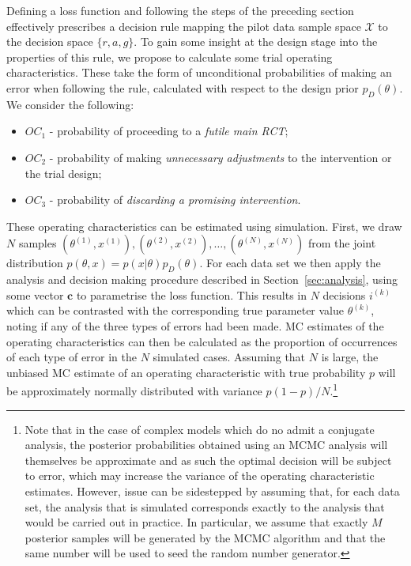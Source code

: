 \documentclass{article} %
\begin{document}
Defining a loss function and following the steps of the preceding section effectively prescribes a decision rule mapping the pilot data sample space $\mathcal{X}$ to the decision space $\{r, a, g\}$. To gain some insight at the design stage into the properties of this rule, we propose to calculate some trial operating characteristics. These take the form of unconditional probabilities of making an error when following the rule, calculated with respect to the design prior $p_D(\theta)$. We consider the following:
\begin{itemize}
\item $OC_1$ - probability of proceeding to a \emph{futile main RCT};
\item $OC_2$ - probability of making \emph{unnecessary adjustments} to the intervention or the trial design;
\item $OC_3$ - probability of \emph{discarding a promising intervention}.
\end{itemize}

These operating characteristics can be estimated using simulation. First, we draw $N$ samples $(\theta^{(1)}, x^{(1)}), (\theta^{(2)}, x^{(2)}), \ldots , (\theta^{(N)}, x^{(N)})$ from the joint distribution $p(\theta, x) = p(x | \theta)p_D(\theta)$. For each data set we then apply the analysis and decision making procedure described in Section~\ref{sec:analysis}, using some vector $\mathbf{c}$ to parametrise the loss function. This results in $N$ decisions $i^{(k)}$ which can be contrasted with the corresponding true parameter value $\theta^{(k)}$, noting if any of the three types of errors had been made. MC estimates of the operating characteristics can then be calculated as the proportion of occurrences of each type of error in the $N$ simulated cases. Assuming that $N$ is large, the unbiased MC estimate of an operating characteristic with true probability $p$ will be approximately normally distributed with variance $p(1-p)/N$.\footnote{Note that in the case of complex models which do no admit a conjugate analysis, the posterior probabilities obtained using an MCMC analysis will themselves be approximate and as such the optimal decision will be subject to error, which may increase the variance of the operating characteristic estimates. However, issue can be sidestepped by assuming that, for each data set, the analysis that is simulated corresponds exactly to the analysis that would be carried out in practice. In particular, we assume that exactly $M$ posterior samples will be generated by the MCMC algorithm and that the same number will be used to seed the random number generator.}
\end{document}

